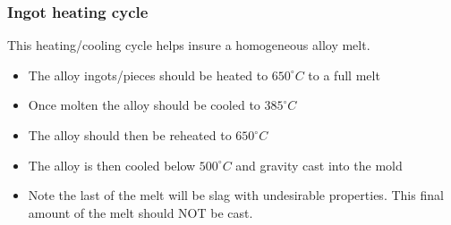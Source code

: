 \subsubsection{Ingot heating cycle}

This heating/cooling cycle helps insure a homogeneous alloy melt.
\begin{itemize}
\item The \MgZnCa alloy ingots/pieces should be heated to $650^{\circ}C$ to a full melt
\item Once molten the alloy should be cooled to $385^{\circ}C$
\item The alloy should then be reheated to $650^{\circ}C$
\item The alloy is then cooled below $500^{\circ}C$ and gravity cast into the mold
\item Note the last of the melt will be slag with undesirable properties. This final amount of the melt should NOT be cast.
\end{itemize}